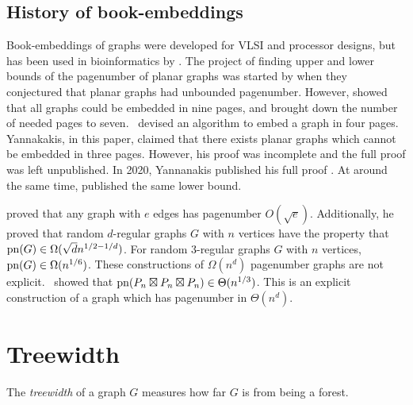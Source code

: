 \subsection{History of book-embeddings}\label{ssec:Pagenumber_History}
Book-embeddings of graphs were developed for VLSI and processor designs, but has been used in bioinformatics by \textcite{haslingerRNAStructuresPseudoknots1999}.
The project of finding upper and lower bounds of the pagenumber of planar graphs was started by \textcite{bernhartBookThicknessGraph1979} when they conjectured that planar graphs had unbounded pagenumber. However, \textcite{bussPagenumberPlanarGraphs1984} showed that all graphs could be embedded in nine pages, and \textcite{heathEmbeddingPlanarGraphs1984} brought down the number of needed pages to seven.\ \textcite{yannakakisEmbeddingPlanarGraphs1989} devised an algorithm to embed a graph in four pages. Yannakakis, in this paper, claimed that there exists planar graphs which cannot be embedded in three pages. However, his proof was incomplete and the full proof was left unpublished. In 2020, Yannanakis published his full proof \cite{yannakakisPlanarGraphsThat2020}. At around the same time, \textcite{kaufmannFourPagesAre2020} published the same lower bound.

\textcite{malitzGraphsEdgesHave1994} proved that any graph with $e$ edges has pagenumber $O(\sqrt{e})$. Additionally, he proved that random $d$-regular graphs $G$ with $n$ vertices have the property that $\operatorname{pn}(G) \in \Omega(\sqrt{d} n^{1/2 - 1/d})$. For random 3-regular graphs $G$ with $n$ vertices, $\operatorname{pn}(G) \in \Omega(n^{1/6})$. These constructions of $\Omega(n^d)$ pagenumber graphs are not explicit.\ \textcite{eppsteinThreeDimensionalGraphProducts2024} showed that $\operatorname{pn}(P_n \boxtimes P_n \boxtimes P_n) \in \Theta(n^{1/3})$. This is an explicit construction of a graph which has pagenumber in $\Theta(n^{d})$. 
\section{Treewidth}\label{sec:treewidth}
The \textit{treewidth} of a graph \(G\) measures how far \(G\) is from being a forest.

